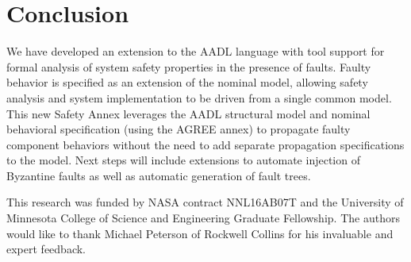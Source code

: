 \section{Conclusion}

We have developed an extension to the AADL language with tool support for formal analysis of system safety properties in the presence of faults. Faulty behavior is specified as an extension of the nominal model, allowing safety analysis and system implementation to be driven from a single common model. This new Safety Annex leverages the AADL structural model and nominal behavioral specification (using the AGREE annex) to propagate faulty component behaviors without the need to add separate propagation specifications to the model.   Next steps will include extensions to automate injection of Byzantine faults as well as automatic generation of fault trees.  

\vspace{2 mm}
 This research was funded by NASA contract NNL16AB07T and the University of Minnesota College of Science and Engineering Graduate Fellowship. The authors would like to thank Michael Peterson of Rockwell Collins for his invaluable and expert feedback. 


